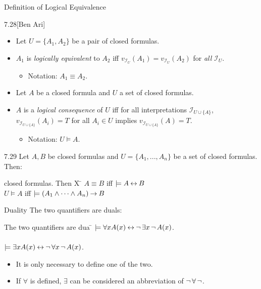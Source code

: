 \documentclass[style=sailor,size=12pt]{powerdot}
\begin{document}
\begin{wideslide}[bm=,toc=]{Definition of Logical Equivalence}
\begin{defn}{7.28}[Ben Ari]
\end{defn}
\vspace{-2ex}
\begin{itemize}
\item<2-> Let $U = \{A_1,A_2\}$ be a pair of closed formulas. 
\item<3-> $A_1$ is \emph{logically equivalent} to $A_2$ iff \pause[3] $v_{{\mathcal{I}_U}}(A_1) =
v_{{\mathcal{I}_U}}(A_2)$ for \emph{all} $\mathcal{I}_U$.
\begin{itemize}
\item<5-> Notation: $A_1 \equiv A_2$.
\end{itemize}
\item<6-> Let $A$ be a closed formula and $U$ a set of closed formulas.
\item<7-> $A$ is a \emph{logical consequence} of $U$ iff \pause[4] for all interpretations
$\mathcal{I}_{U \cup \{A\}}$, $v_{\mathcal{I}_{U \cup \{A\}}}(A_i) = T$ for
all $A_i \in U$ implies $v_{\mathcal{I}_{U \cup \{A\}}}(A) = T$. 
\begin{itemize}
\item<9-> Notation: $U \models A$.
\end{itemize}
\end{itemize}
\vspace{-5mm}
\pause[2]
\begin{thm}{7.29}
Let $A,B$ be closed formulas and $U = \{A_1,...,A_n\}$ be a set of
closed formulas. Then:
\end{thm}
\vspace{-5ex}
\begin{tabbing}
closed formulas. Then X \= \kill
\> $A \equiv B$ iff $\models A \mathbin{\leftrightarrow} B$\\
\> $U \models A$ iff $\models (A_1 \land \cdots \land A_n) \mathbin{\rightarrow} B$
\end{tabbing}

\end{wideslide}

\begin{wideslide}[bm=,toc=]{Duality}
The two quantifiers are duals:
\pause
\begin{tabbing}
The two quantifiers are dua \= \kill
\> $\models \forall x A(x) \mathbin{\leftrightarrow} \mathop{\neg} \exists x \mathop{\neg} A(x)$.\\
\> ~\\ 
\pause
\> $\models \exists x A(x) \mathbin{\leftrightarrow} \mathop{\neg} \forall x \mathop{\neg} A(x)$.
\end{tabbing}
\pause
\begin{itemize}
\item It is only necessary to define one of the two.
\item If $\forall$ is defined, $\exists$ can be considered an abbreviation of
      $\mathop{\neg} \forall \mathop{\neg}$.
\end{itemize}

\end{wideslide}
\end{document}
